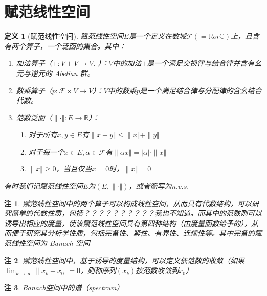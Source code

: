 \documentclass{article}                     %
\numberwithin{equation}{section}            %
\numberwithin{figure}{section}              %
\numberwithin{table}{section}               %
\newtheorem{definition}{\indent 定义}[section]
\newtheorem{remark}{\indent 注}[section]
\begin{document}
\section{赋范线性空间}
\begin{definition}[赋范线性空间]
    赋范线性空间$E$是一个定义在数域$\mathcal{F} (=\mathbb{R} or \mathbb{C} )$上，且含有两个算子，一个泛函的集合。其中：
    \begin{enumerate}
        \item 加法算子（$+:V+V\to V.$ ）：$V$中的加法$+$是一个满足交换律与结合律并含有幺元与逆元的 Abelian 群。
        \item 数乘算子（$p:\mathcal{F} \times V\to V$）：$V$中的数乘$p$是一个满足结合律与分配律的含幺结合代数。
        \item 范数泛函（$\| \cdot \Vert :E\to \mathbb{R} $）：
        \begin{enumerate}
            \item 对于所有$x,y\in E$有$\| x+y \Vert \le \| x \Vert +\| y \Vert $
            \item 对于每一个$x\in E,\alpha \in \mathcal{F} $有$\| \alpha x \Vert =|\alpha |\cdot \| x \Vert$
            \item $\|x \Vert\ge 0 $，当且仅当$x=0$时，$\|x \Vert = 0$
        \end{enumerate}
    \end{enumerate}
    有时我们记赋范线性空间$E$为$(E,\| \cdot\Vert )$，或者简写为$n.v.s.$
\end{definition}
\begin{remark}
    赋范线性空间中的两个算子可以构成线性空间，从而具有代数结构，可以研究简单的代数性质，包括？？？？？？？？？？我也不知道。而其中的范数则可以诱导出相应的度量，使该赋范线性空间具有第四种结构（由度量函数给予的），从而便于研究其分析学性质，包括完备性、紧性、有界性、连续性等。其中完备的赋范线性空间为 Banach 空间
\end{remark}
\begin{remark}
    赋范线性空间中，基于诱导的度量结构，可以定义依范数的收敛（如果$\lim_{k\to \infty}\|x_k-x_0 \Vert=0$，则称序列$(x_k)$按范数收敛到$x_0$）
\end{remark}

\begin{remark}
    Banach空间中的谱（spectrum）
\end{remark}
\end{document}
